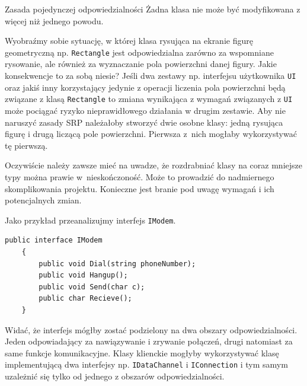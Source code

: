 \begin{myboxWithTitle}{Zasada pojedynczej odpowiedzialności}
	Żadna klasa nie może być modyfikowana z więcej niż jednego powodu.
\end{myboxWithTitle}

Wyobraźmy sobie sytuację, w której klasa rysująca na ekranie figurę geometryczną np. \texttt{Rectangle} jest odpowiedzialna zarówno za wspomniane rysowanie, ale również za wyznaczanie pola powierzchni danej figury. Jakie konsekwencje to za sobą niesie? Jeśli dwa zestawy np. interfejsu użytkownika \texttt{UI} oraz jakiś inny korzystający jedynie z operacji liczenia pola powierzchni będą związane z klasą \texttt{Rectangle} to zmiana wynikająca z wymagań związanych z \texttt{UI} może pociągać ryzyko nieprawidłowego działania w drugim zestawie. Aby nie naruszyć zasady SRP należałoby stworzyć dwie osobne klasy: jedną rysująca figurę i drugą liczącą pole powierzchni. Pierwsza z~nich mogłaby wykorzystywać tę pierwszą. 

Oczywiście należy zawsze mieć na uwadze, że rozdrabniać klasy na coraz mniejsze typy można prawie w~nieskończoność. Może to prowadzić do nadmiernego skomplikowania projektu. Konieczne jest branie pod uwagę wymagań i ich potencjalnych zmian.

Jako przykład przeanalizujmy interfejs \texttt{IModem}.
\begin{lstlisting}[caption={Naruszenie zasady SRP}, label={lab1/lst/srpViolationModem}]
	public interface IModem
	{
		public void Dial(string phoneNumber);
		public void Hangup();
		public void Send(char c);
		public char Recieve();
	}
\end{lstlisting}
Widać, że interfejs mógłby zostać podzielony na dwa obszary odpowiedzialności. Jeden odpowiadający za nawiązywanie i zrywanie połączeń, drugi natomiast za same funkcje komunikacyjne. Klasy klienckie mogłyby wykorzystywać klasę implementującą dwa interfejsy np. \texttt{IDataChannel} i \texttt{IConnection} i tym samym uzależnić się tylko od jednego z obszarów odpowiedzialności. 

